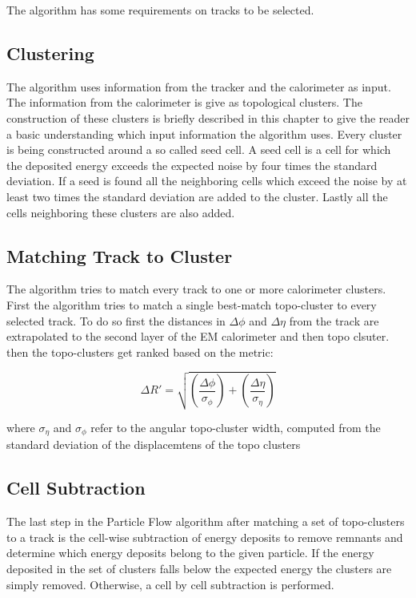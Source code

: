 The algorithm has some requirements on tracks to be selected. 



\subsection{Clustering}

The algorithm uses information from the tracker and the calorimeter as input. The information from the calorimeter is give as topological clusters. The construction of these clusters is briefly described in this chapter to give the reader a basic understanding which input information the algorithm uses.
Every cluster is being constructed around a so called seed cell. A seed cell is a cell for which the deposited energy exceeds the expected noise by four times the standard deviation. If a seed is found all the neighboring cells which exceed the noise by at least two times the standard deviation are added to the cluster. Lastly all the cells neighboring these clusters are also added.


\subsection{Matching Track to Cluster}

The algorithm tries to match every track to one or more calorimeter clusters. First the algorithm tries to match a single best-match topo-cluster to every selected track.
To do so first the distances in $\Delta \phi$ and $\Delta \eta$ from the track are extrapolated to the second layer of the EM calorimeter and then topo clsuter. then the topo-clusters get ranked based on the metric:

\begin{equation}
\Delta R' = \sqrt{\left(\frac{\Delta \phi}{\sigma_{\phi}}\right)+\left(\frac{\Delta \eta}{\sigma_{\eta}}\right)}
\end{equation}

where $\sigma_{\eta}$ and $\sigma_{\phi}$ refer to the angular topo-cluster width, computed from the standard deviation of the displacemtens of the topo clusters 

\subsection{Cell Subtraction}

The last step in the Particle Flow algorithm after matching a set of topo-clusters to a track is the cell-wise subtraction of energy deposits to remove remnants and determine which energy deposits belong to the given particle.
If the energy deposited in the set of clusters falls below the expected energy the clusters are simply removed. Otherwise, a cell by cell subtraction is performed.

